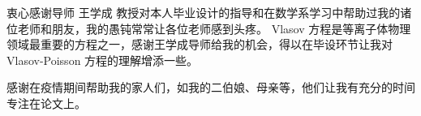\begin{acknowledgement}
  衷心感谢导师 王学成 教授对本人毕业设计的指导和在数学系学习中帮助过我的诸位老师和朋友，我的愚钝常常让各位老师感到头疼。 Vlasov 方程是等离子体物理领域最重要的方程之一，感谢王学成导师给我的机会，得以在毕设环节让我对 Vlasov-Poisson 方程的理解增添一些。

  感谢在疫情期间帮助我的家人们，如我的二伯娘、母亲等，他们让我有充分的时间专注在论文上。


\end{acknowledgement}
